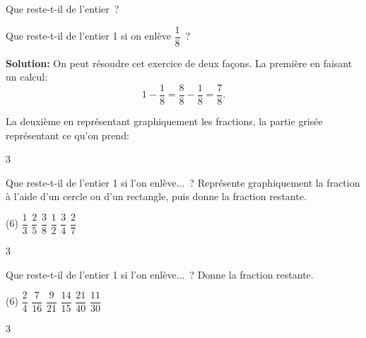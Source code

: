 \documentclass[a4paper,11pt]{report}
\begin{document}
\begin{resolu}{Que reste-t-il de l'entier~?}{

Que reste-t-il de l'entier 1 si on enlève $\dfrac{1}{8}$~?

{\bfseries Solution:} On peut résoudre cet exercice de deux façons. La première en faisant un calcul:
\[1-\dfrac{1}{8}=\dfrac{8}{8}-\dfrac{1}{8}=\dfrac{7}{8}.\]

La deuxième en représentant graphiquement les fractions, la partie grisée représentant ce qu'on prend:
\begin{center}
\end{center}
\vspace{-0.5cm}
}
{3}
\end{resolu}

\begin{exo}
{Que reste-t-il de l'entier 1 si l'on enlève...~?
Représente graphiquement la fraction à l'aide d'un cercle ou d'un rectangle, puis donne la fraction restante.

\begin{tasks}[after-skip=-0.5em](6)
\task $\dfrac{1}{3}$
\task $\dfrac{2}{5}$
\task $\dfrac{3}{8}$
\task $\dfrac{1}{2}$
\task $\dfrac{3}{4}$
\task $\dfrac{2}{7}$
\end{tasks}}
{3}
\end{exo}

\begin{exo}
{Que reste-t-il de l'entier 1 si l'on enlève...~?
Donne la fraction restante.

\begin{tasks}[after-skip=-0.5em](6)
\task $\dfrac{2}{4}$
\task $\dfrac{7}{16}$
\task $\dfrac{9}{21}$
\task $\dfrac{14}{15}$
\task $\dfrac{21}{40}$
\task $\dfrac{11}{30}$
\end{tasks}}
{3}
\end{exo}
\end{document}
